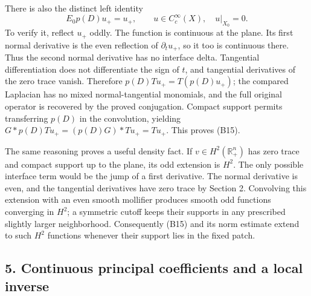 \documentclass[
  11pt,
]{article}
\makeatletter
\let\ReaderOriginalAnchorStart\hyper@anchorstart
\let\ReaderOriginalAnchorEnd\hyper@anchorend
\let\ReaderPendingAliases\@empty
\def\ReaderArmAliases#1{\gdef\ReaderPendingAliases{#1}}
\def\hyper@anchorstart#1{\ReaderIfNativeAnchorTF{#1}{\ReaderPendingAliases\global\let\ReaderPendingAliases\@empty}{}\ReaderOriginalAnchorStart{#1}}
\makeatother
\begin{document}
There is also the distinct left identity \[
 E_0p(D)u_+=u_+,\qquad
 u\in C_c^\infty(X),\quad u|_{X_0}=0. \tag{B15}
\] To verify it, reflect \(u_+\) oddly. The function is continuous at
the plane. Its first normal derivative is the even reflection of
\(\partial_tu_+\), so it too is continuous there. Thus the second normal
derivative has no interface delta. Tangential differentiation does not
differentiate the sign of \(t\), and tangential derivatives of the zero
trace vanish. Therefore \(p(D)Tu_+=T(p(D)u_+)\); the compared Laplacian
has no mixed normal-tangential monomials, and the full original operator
is recovered by the proved conjugation. Compact support permits
transferring \(p(D)\) in the convolution, yielding
\(G*p(D)Tu_+=(p(D)G)*Tu_+=Tu_+\). This proves (B15).

The same reasoning proves a useful density fact. If
\(v\in H^2(\mathbb R^n_+)\) has zero trace and compact support up to the
plane, its odd extension is \(H^2\). The only possible interface term
would be the jump of a first derivative. The normal derivative is even,
and the tangential derivatives have zero trace by Section 2. Convolving
this extension with an even smooth mollifier produces smooth odd
functions converging in \(H^2\); a symmetric cutoff keeps their supports
in any prescribed slightly larger neighborhood. Consequently (B15) and
its norm estimate extend to such \(H^2\) functions whenever their
support lies in the fixed patch.

\ReaderArmAliases{\ReaderOriginalAnchorStart{AN03-SBD-005}\ReaderOriginalAnchorEnd\begingroup\expandafter\def\csname @currentHref\endcsname{AN03-SBD-005}\label{AN03-SBD-005}\endgroup\ReaderOriginalAnchorStart{an03-sbd-005-continuous-principal-coefficients-and-a-local-inverse}\ReaderOriginalAnchorEnd\begingroup\expandafter\def\csname @currentHref\endcsname{an03-sbd-005-continuous-principal-coefficients-and-a-local-inverse}\label{an03-sbd-005-continuous-principal-coefficients-and-a-local-inverse}\endgroup\ReaderOriginalAnchorStart{5-continuous-principal-coefficients-and-a-local-inverse}\ReaderOriginalAnchorEnd\begingroup\expandafter\def\csname @currentHref\endcsname{5-continuous-principal-coefficients-and-a-local-inverse}\label{5-continuous-principal-coefficients-and-a-local-inverse}\endgroup\ReaderOriginalAnchorStart{continuous-principal-coefficients-and-a-local-inverse}\ReaderOriginalAnchorEnd}
\subsection{5. Continuous principal coefficients and a local
inverse}\label{continuous-principal-coefficients-and-a-local-inverse}
\end{document}
